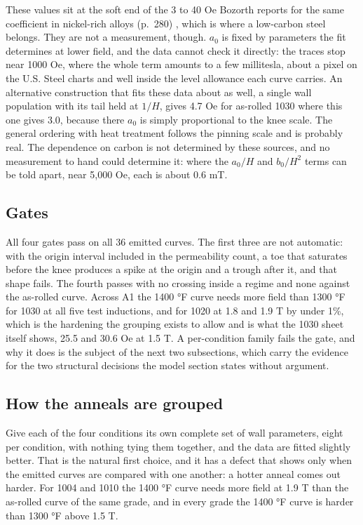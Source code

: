 \documentclass[
  11pt,
]{article}
\newcounter{none} %
\begin{document}
These values sit at the soft end of the 3 to 40 Oe Bozorth reports for the same coefficient in nickel-rich alloys (p.~280) \cite{bozorth1951}, which is where a low-carbon steel belongs. They are not a measurement, though. \(a_0\) is fixed by parameters the fit determines at lower field, and the data cannot check it directly: the traces stop near 1000 Oe, where the whole term amounts to a few millitesla, about a pixel on the U.S. Steel charts and well inside the level allowance each curve carries. An alternative construction that fits these data about as well, a single wall population with its tail held at \(1/H\), gives 4.7 Oe for as-rolled 1030 where this one gives 3.0, because there \(a_0\) is simply proportional to the knee scale. The general ordering with heat treatment follows the pinning scale and is probably real. The dependence on carbon is not determined by these sources, and no measurement to hand could determine it: where the \(a_0/H\) and \(b_0/H^{2}\) terms can be told apart, near 5,000 Oe, each is about 0.6 mT.

\subsection{Gates}\label{gates}

All four gates pass on all 36 emitted curves. The first three are not automatic: with the origin interval included in the permeability count, a toe that saturates before the knee produces a spike at the origin and a trough after it, and that shape fails. The fourth passes with no crossing inside a regime and none against the as-rolled curve. Across A1 the 1400 °F curve needs more field than 1300 °F for 1030 at all five test inductions, and for 1020 at 1.8 and 1.9 T by under 1\%, which is the hardening the grouping exists to allow and is what the 1030 sheet itself shows, 25.5 and 30.6 Oe at 1.5 T. A per-condition family fails the gate, and why it does is the subject of the next two subsections, which carry the evidence for the two structural decisions the model section states without argument.

\subsection{How the anneals are grouped}\label{how-the-anneals-are-grouped}

Give each of the four conditions its own complete set of wall parameters, eight per condition, with nothing tying them together, and the data are fitted slightly better. That is the natural first choice, and it has a defect that shows only when the emitted curves are compared with one another: a hotter anneal comes out harder. For 1004 and 1010 the 1400 °F curve needs more field at 1.9 T than the as-rolled curve of the same grade, and in every grade the 1400 °F curve is harder than 1300 °F above 1.5 T.
\end{document}
